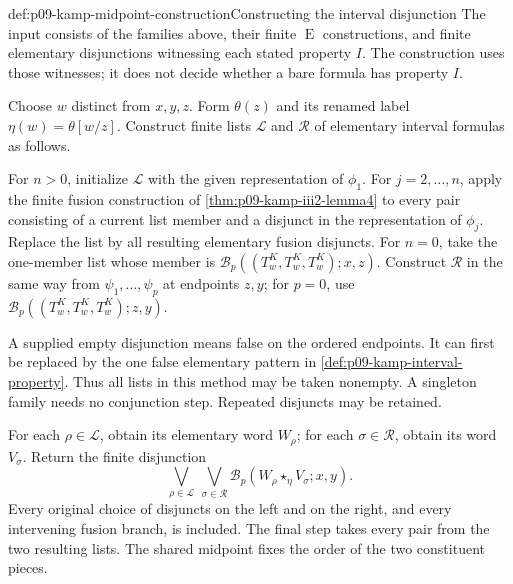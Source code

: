\begin{hbmethod}{def:p09-kamp-midpoint-construction}{Constructing the interval disjunction}
The input consists of the families above, their finite
\(\operatorname{E}\) constructions, and finite elementary disjunctions
witnessing each stated property \(I\). The construction uses those
witnesses; it does not decide whether a bare formula has property \(I\).

Choose \(w\) distinct from \(x,y,z\). Form \(\theta(z)\) and its renamed label
\(\eta(w)=\theta[w/z]\). Construct finite lists \(\mathcal L\) and
\(\mathcal R\) of elementary interval formulas as follows.

For \(n>0\), initialize \(\mathcal L\) with the given representation
of \(\phi_1\). For \(j=2,\ldots,n\), apply the finite fusion construction
of \cref{thm:p09-kamp-iii2-lemma4} to every pair consisting of a
current list member and a disjunct in the representation of \(\phi_j\).
Replace the list by all resulting elementary fusion disjuncts.
For \(n=0\), take the one-member list whose member is
\(\mathcal B_p((T^K_w,T^K_w,T^K_w);x,z)\).
Construct \(\mathcal R\) in the same way from
\(\psi_1,\ldots,\psi_p\) at endpoints \(z,y\); for \(p=0\), use
\(\mathcal B_p((T^K_w,T^K_w,T^K_w);z,y)\).

A supplied empty disjunction means false on the ordered endpoints.
It can first be replaced by the one false elementary pattern in
\cref{def:p09-kamp-interval-property}. Thus all lists in this method
may be taken nonempty. A singleton family needs no conjunction step.
Repeated disjuncts may be retained.

For each \(\rho\in\mathcal L\), obtain its elementary word \(W_\rho\);
for each \(\sigma\in\mathcal R\), obtain its word \(V_\sigma\).
Return the finite disjunction
\[
 \bigvee_{\rho\in\mathcal L}\ \bigvee_{\sigma\in\mathcal R}
       \mathcal B_p(W_\rho\mathbin{\star_\eta}V_\sigma;x,y).
\]
Every original choice of disjuncts on the left and on the right,
and every intervening fusion branch, is included. The final step takes
every pair from the two resulting lists. The shared midpoint fixes
the order of the two constituent pieces.
\end{hbmethod}

